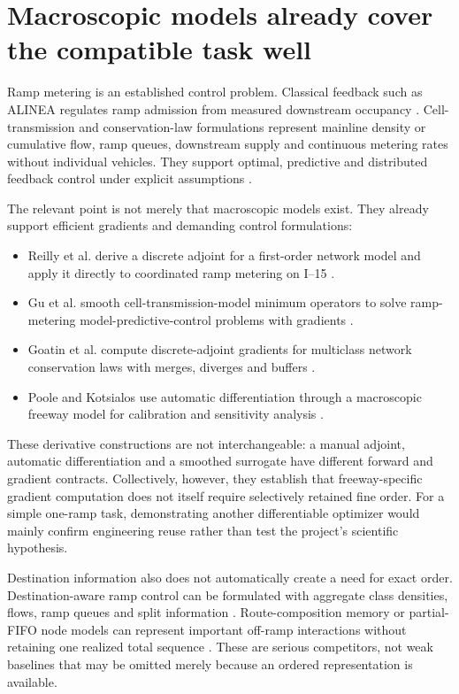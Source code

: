 \documentclass[10pt]{article}
\begin{document}
\section{Macroscopic models already cover the compatible task well}

Ramp metering is an established control problem. Classical feedback such as ALINEA regulates ramp admission from measured downstream occupancy \cite{papageorgiou1991}. Cell-transmission and conservation-law formulations represent mainline density or cumulative flow, ramp queues, downstream supply and continuous metering rates without individual vehicles. They support optimal, predictive and distributed feedback control under explicit assumptions \cite{gomes2006,schmitt2017}.

The relevant point is not merely that macroscopic models exist. They already support efficient gradients and demanding control formulations:

\begin{itemize}
  \item Reilly et al. derive a discrete adjoint for a first-order network model and apply it directly to coordinated ramp metering on I--15 \cite{reilly2015}.
  \item Gu et al. smooth cell-transmission-model minimum operators to solve ramp-metering model-predictive-control problems with gradients \cite{gu2022}.
  \item Goatin et al. compute discrete-adjoint gradients for multiclass network conservation laws with merges, diverges and buffers \cite{goatin2026}.
  \item Poole and Kotsialos use automatic differentiation through a macroscopic freeway model for calibration and sensitivity analysis \cite{poole2016}.
\end{itemize}

These derivative constructions are not interchangeable: a manual adjoint, automatic differentiation and a smoothed surrogate have different forward and gradient contracts. Collectively, however, they establish that freeway-specific gradient computation does not itself require selectively retained fine order. For a simple one-ramp task, demonstrating another differentiable optimizer would mainly confirm engineering reuse rather than test the project's scientific hypothesis.

Destination information also does not automatically create a need for exact order. Destination-aware ramp control can be formulated with aggregate class densities, flows, ramp queues and split information \cite{zhang2024}. Route-composition memory or partial-FIFO node models can represent important off-ramp interactions without retaining one realized total sequence \cite{salehi2017,wright2017}. These are serious competitors, not weak baselines that may be omitted merely because an ordered representation is available.
\end{document}
